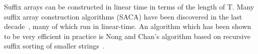 \begin{table}
	\begin{center}
		\hspace{1cm}
		\hspace{1cm}
        \caption{$T=\text{BANANA\$}$}
        \label{table:BANANA}
	\end{center}
\end{table}


Suffix arrays can be constructed in linear time in terms of the length of T. Many suffix
array construction algorithms (SACA) have been discovered in the last
decade~\cite{SuffixArrayConstruction}, many of which run in linear-time. An algorithm which
has been shown to be very efficient in practice is Nong and Chan's algorithm based on
recursive suffix sorting of smaller strings~\cite{LinearTimeSuffixArraySAIS}. 

